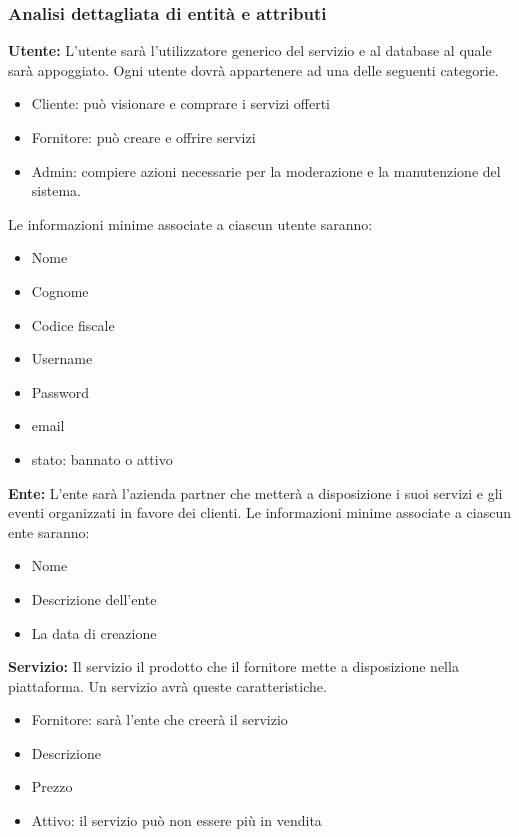 \subsubsection{Analisi dettagliata di entità e attributi}

\textbf{Utente:} L'utente sarà l'utilizzatore generico del servizio e al database al quale sarà appoggiato. 
Ogni utente dovrà appartenere ad una delle seguenti categorie. 
\begin{itemize}
    \item Cliente: può visionare e comprare i servizi offerti
    \item Fornitore: può creare e offrire servizi
    \item Admin: compiere azioni necessarie per la moderazione e la manutenzione del sistema.
\end{itemize}
Le informazioni minime associate a ciascun utente saranno: 
\begin{itemize}
    \item Nome
    \item Cognome
    \item Codice fiscale
    \item Username
    \item Password
    \item email
    \item stato: bannato o attivo
\end{itemize}

\textbf{Ente:} L'ente sarà l'azienda partner che metterà a disposizione i suoi servizi e gli eventi organizzati in favore dei clienti.
Le informazioni minime associate a ciascun ente saranno:
\begin{itemize}
    \item Nome
    \item Descrizione dell'ente
    \item La data di creazione
\end{itemize}

\textbf{Servizio:} Il servizio il prodotto che il fornitore mette a disposizione nella piattaforma.
Un servizio avrà queste caratteristiche.
\begin{itemize}
    \item Fornitore: sarà l'ente che creerà il servizio
    \item Descrizione
    \item Prezzo
    \item Attivo: il servizio può non essere più in vendita
\end{itemize}

